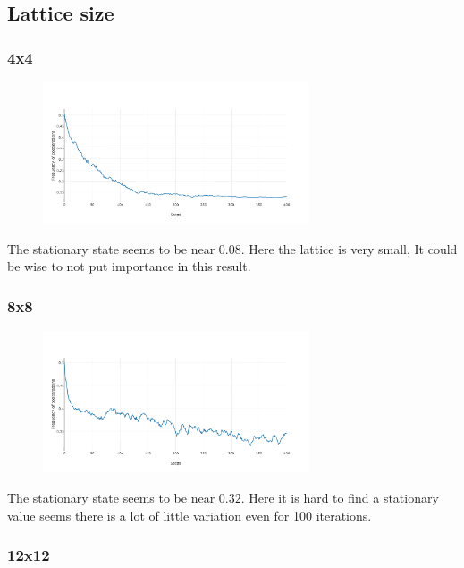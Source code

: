 \documentclass[11pt]{article}
\begin{document}
\subsection{Lattice size}

\subsubsection{4x4}

\begin{figure}[H]
   \includegraphics[width=0.7\textwidth]{img/part2/part2-moore-4-4.png}
\end{figure}
The stationary state seems to be near $0.08$. Here the lattice is very small, It could be wise to not put importance in this result.

\subsubsection{8x8}

\begin{figure}[H]
\centering
   \includegraphics[width=0.7\textwidth]{img/part2/part2-moore-8-8.png}
\end{figure}
The stationary state seems to be near $0.32$. Here it is hard to find a stationary value seems there is a lot of little variation even for 100 iterations.


\subsubsection{12x12}
\end{document}

